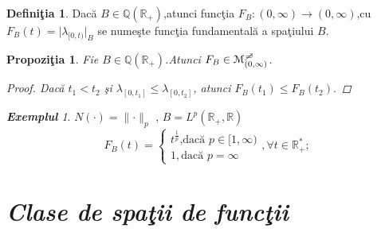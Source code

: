 \documentclass[ a4paper, 12pt]{report}
\newtheorem{prop}[theorem]{\bf Propozi\c tia }
\theoremstyle{definition}
\newtheorem{definition}{\bf Defini\c tia}[section]
\theoremstyle{remark}
\newtheorem{exemple}{\bf Exemplul}[section]
\numberwithin{equation}{section}
\begin{document}
\begin{definition}
Dac\u a $B\in \mathbb{Q}(\mathbb{R}_+)$,atunci func\c tia $F_B : (0,\infty)\rightarrow(0,\infty)$,cu \hspace{5mm} $F_B{(t)} = \lvert \lambda_ {[0,t)} \rvert_B$ se nume\c ste func\c tia fundamental\u a a spa\c tiului $B$.
\end{definition}
\begin{prop}
Fie $B\in \mathbb{Q}(\mathbb{R}_+)$.Atunci $F_B \in \mathcal{M}_{(0,\infty)}^ {\mc} $.
\begin{proof}
Dac\u a $t_1 < t_2$ \c si $\lambda_{[0,t_1]} \leqslant \lambda_{[0,t_2]}$, atunci $F_B{(t_1)}\leqslant F_B{(t_2)}.$
\end{proof}
\end{prop}
\begin{exemple}
$N(\cdot) = \lVert \cdot \rVert_p$ , $B = L^p(\mathbb{R}_+ , \mathbb{R})$\\
\[
F_B{(t)}=
\begin{cases}
t^{\frac{1}{p}} \text{,dac\u a $p \in [1,\infty)$} \\
1 ,\text{dac\u a $p = \infty$}
\end{cases}, \forall  t \in \mathbb{R}_+^{*};
\]
\end{exemple}


\section{\textit{Clase de spa\c tii de func\c tii}}
\end{document}
